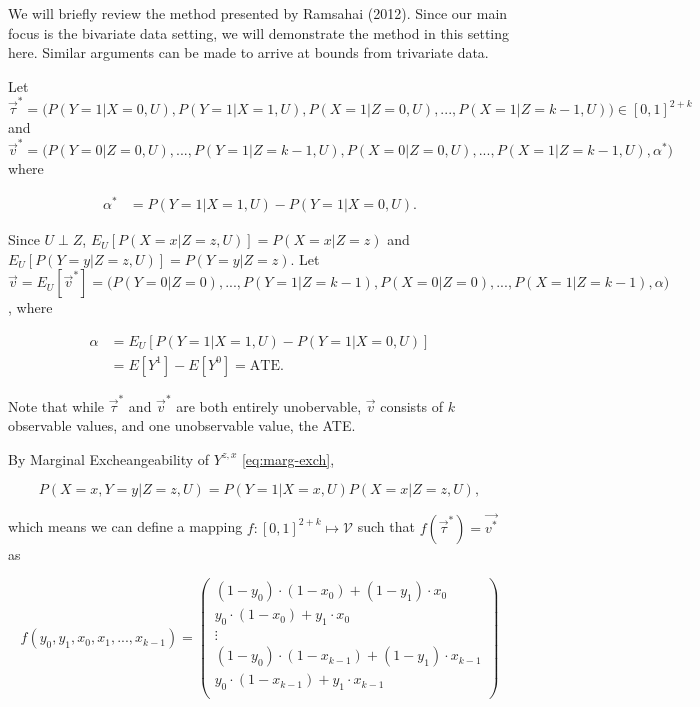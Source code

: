 \documentclass[
]{article}
\theoremstyle{plain}
\begin{document}
\iffalse

Briefly review Ramsahai's approach, and reference theorem
\fi

We will briefly review the method presented by Ramsahai (2012). Since our main focus is the bivariate data setting, we will demonstrate the method in this setting here. Similar arguments can be made to arrive at bounds from trivariate data.

Let \(\vec{\tau}^* = \Big(P(Y = 1 | X = 0, U), P(Y = 1 | X = 1, U), P(X = 1 | Z = 0, U), ..., P(X = 1 | Z = k-1, U)\Big) \in [0,1]^{2+k}\) and \(\vec{v}^* = \Big(P(Y = 0 | Z = 0, U), ..., P(Y = 1 | Z = k-1, U), P(X = 0 | Z = 0, U), ..., P(X = 1 | Z = k-1, U), \alpha^*\Big)\) where

\[
\begin{aligned}
\alpha^* &= P(Y = 1 | X = 1, U) - P(Y = 1 | X = 0, U).
\end{aligned}
\]

Since \(U \perp Z\), \(E_U[P(X = x | Z = z, U)] = P(X = x | Z = z)\) and \(E_U[P(Y = y | Z = z, U)] = P(Y = y | Z = z)\). Let \(\vec{v} = E_U[\vec{v}^*] = \Big(P(Y = 0 | Z = 0), ..., P(Y = 1 | Z = k-1), P(X = 0 | Z = 0), ..., P(X = 1 | Z = k-1), \alpha \Big)\), where

\[
\begin{aligned}
\alpha &= E_U[P(Y = 1 | X = 1, U) - P(Y = 1 | X = 0, U)] \\
       &= E[Y^1] - E[Y^0] = \text{ATE}.
\end{aligned}
\]

Note that while \(\vec{\tau}^*\) and \(\vec{v}^*\) are both entirely unobervable, \(\vec{v}\) consists of \(k\) observable values, and one unobservable value, the ATE.

By Marginal Excheangeability of \(Y^{z,x}\) \eqref{eq:marg-exch},

\[
P(X = x, Y = y | Z = z, U) = P(Y = 1 | X = x, U) P(X = x | Z = z, U),
\]

which means we can define a mapping \(f:[0,1]^{2+k} \mapsto \mathcal{V}\) such that \(f(\vec{\tau}^*) = \vec{v^*}\) as

\[
f(y_0, y_1, x_0, x_1, ..., x_{k-1}) = 
  \begin{pmatrix} 
    (1-y_0)\cdot(1-x_0) + (1 - y_1)\cdot x_0 \\
    y_0\cdot (1-x_0) + y_1\cdot x_0 \\
    \vdots \\
    (1-y_0)\cdot(1-x_{k-1}) + (1 - y_1)\cdot x_{k-1} \\
    y_0\cdot (1-x_{k-1}) + y_1\cdot x_{k-1} \\
  \end{pmatrix}
\]
\end{document}
